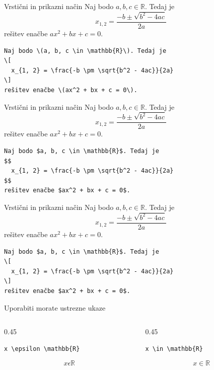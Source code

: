\documentclass[aspectratio=169]{beamer}
\begin{document}
\begin{frame}[fragile]{Vrstični in prikazni način}
  Naj bodo \(a, b, c \in \mathbb{R}\). Tedaj je
  \[
    x_{1, 2} = \frac{-b \pm \sqrt{b^2 - 4ac}}{2a}
  \]
  rešitev enačbe \(ax^2 + bx + c = 0\).

  \begin{verbatim}
Naj bodo \(a, b, c \in \mathbb{R}\). Tedaj je
\[
  x_{1, 2} = \frac{-b \pm \sqrt{b^2 - 4ac}}{2a}
\]
rešitev enačbe \(ax^2 + bx + c = 0\).
  \end{verbatim}
\end{frame}

\begin{frame}[fragile]{Vrstični in prikazni način}
  Naj bodo $a, b, c \in \mathbb{R}$. Tedaj je
  $$
  x_{1, 2} = \frac{-b \pm \sqrt{b^2 - 4ac}}{2a}
  $$
  rešitev enačbe $ax^2 + bx + c = 0$.

  \begin{verbatim}
Naj bodo $a, b, c \in \mathbb{R}$. Tedaj je
$$
  x_{1, 2} = \frac{-b \pm \sqrt{b^2 - 4ac}}{2a}
$$
rešitev enačbe $ax^2 + bx + c = 0$.
  \end{verbatim}
\end{frame}

\begin{frame}[fragile]{Vrstični in prikazni način}
  Naj bodo $a, b, c \in \mathbb{R}$. Tedaj je
  \[
    x_{1, 2} = \frac{-b \pm \sqrt{b^2 - 4ac}}{2a}
  \]
  rešitev enačbe $ax^2 + bx + c = 0$.

  \begin{verbatim}
Naj bodo $a, b, c \in \mathbb{R}$. Tedaj je
\[
  x_{1, 2} = \frac{-b \pm \sqrt{b^2 - 4ac}}{2a}
\]
rešitev enačbe $ax^2 + bx + c = 0$.
  \end{verbatim}
\end{frame}

\begin{frame}[fragile]{Uporabiti morate ustrezne ukaze}
  \begin{columns}[t]
    \begin{column}{0.45\textwidth}
      \begin{slaboenv}
        \begin{verbatim}
x \epsilon \mathbb{R}
        \end{verbatim}
        \[ x \epsilon \mathbb{R} \]
      \end{slaboenv}
    \end{column}
    \begin{column}{0.45\textwidth}
      \begin{dobroenv}
        \begin{verbatim}
x \in \mathbb{R}
        \end{verbatim}
        \[ x \in \mathbb{R} \]
      \end{dobroenv}
    \end{column}
  \end{columns}
\end{frame}
\end{document}
